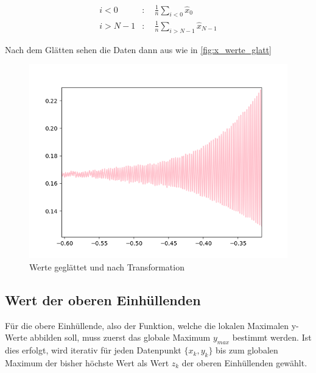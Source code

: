 \begin{align}
    i<0 &: \quad \frac{1}{n}\sum_{i<0} \hat{x}_0\\
    i>N-1 &: \quad \frac{1}{n}\sum_{i>N-1} \hat{x}_{N-1}
\end{align}

Nach dem Glätten sehen die Daten dann aus wie in \autoref{fig:x_werte_glatt}

\begin{figure}[htb]
    \centering
    \includegraphics[scale=0.62]{images/Werte_glatt}
    \caption{Werte geglättet und nach Transformation}
    \label{fig:x_werte_glatt}
\end{figure}

\subsection{Wert der oberen Einhüllenden}\label{subsec:wert-der-oberen-einhüllenden}
Für die obere Einhüllende, also der Funktion, welche die lokalen Maximalen y-Werte abbilden soll, muss zuerst das globale Maximum $y_{max}$ bestimmt werden.
Ist dies erfolgt, wird iterativ für jeden Datenpunkt $\{x_k, y_k\}$ bis zum globalen Maximum der bisher höchste Wert als Wert $z_k$ der oberen Einhüllenden gewählt.

